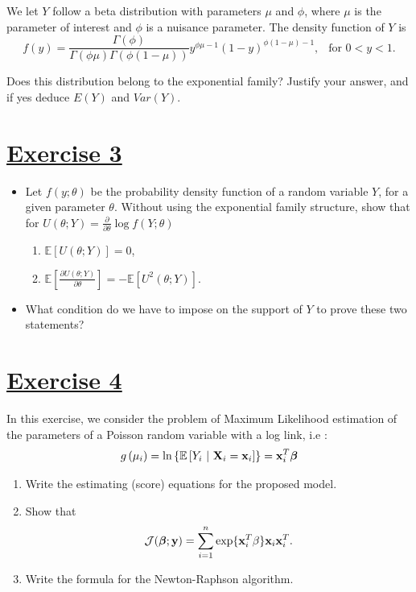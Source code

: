 \documentclass[a4paper,12pt]{article}
\def\by{\mathbf{y}}
\def\bx{\mathbf{x}}
\def\bbeta{\mbox{\boldmath $\beta$}}
\def\bX{\mathbf{X}}
\def\op{\left(}
\def\cp{\right)}
\def\oc{\left[}
\def\cc{\right]}
\def\ok{\left\{}
\def\ck{\right\}}
\def\exE{\mathbb{E}}
\begin{document}
We let $Y$ follow a beta distribution with parameters $\mu$ and  $\phi$, where $\mu$ is the parameter of interest and $\phi$ is a nuisance parameter. The density function of $Y$ is
$$f(y ) = \frac{\Gamma(\phi)}{\Gamma(\phi \mu)\Gamma(\phi (1-\mu) )} y^{\phi \mu - 1} (1-y)^{\phi (1-\mu) -1},  \ \  \mbox{ for } 0 < y < 1.$$

Does this distribution belong to the exponential family? Justify your answer, and if yes deduce $E(Y)$ and $Var(Y)$.

\section{\underline{Exercise 3}}

\begin{itemize}
\item Let $f(y;\theta)$ be the probability density function of a random variable $Y$, for a given parameter $\theta$. Without using the exponential family structure, show that for ${\displaystyle U(\theta;Y) = \frac{\partial}{\partial \theta} \log f(Y;\theta)}$
\begin{enumerate}
    \item{$\exE\left[U(\theta;Y)\right]=0$,}
    \item{${\displaystyle \exE\left[\frac{\partial U(\theta;Y)}{ \partial \theta}\right]=  - \exE\oc U^2(\theta;Y)\cc}$.}
\end{enumerate}
\item What condition do we have to impose on the support of $Y$ to prove these two statements?
\end{itemize}


\section{\underline{Exercise 4}}

In this exercise, we consider the problem of Maximum Likelihood estimation of the parameters of a Poisson random variable with a log link, i.e : 
\begin{equation*}
    g\op\mu_i\cp = \mathrm{ln}\ok \exE \oc Y_i \ | \ \bX_i = \bx_i  \cc\ck = \bx_i^T\bbeta
\end{equation*}

\begin{enumerate}
  \item Write the estimating (score) equations for the proposed model.
  \item Show that 
    \begin{equation*}
   \mathcal J(\bbeta; \by) 
   = \sum_{i=1}^n \exp\{\bx_i^T\beta\} 
   \bx_i \bx_i^T.
   \label{eq:J}
  \end{equation*}
  \item Write the formula for the Newton-Raphson algorithm.  

\end{enumerate}
\end{document}
